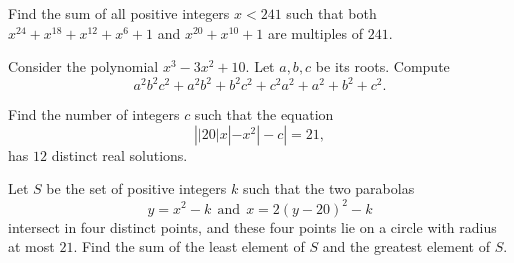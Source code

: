 \documentclass[11pt]{article}
\theoremstyle{definition}
\begin{document}
%	



\begin{question}[name={2020-21 CHMMC Winter, Tiebreaker Round, \href{https://artofproblemsolving.com/community/c126h2426280p20002356}{Problem 2}}]
	Find the sum of all positive integers $x < 241$ such that both $x^{24} + x^{18} + x^{12} + x^6 + 1$ and $x^{20} + x^{10} + 1$ are multiples of $241$.	
\end{question}




%	


\begin{question}[name={2020-21 CHMMC Winter, Tiebreaker Round, \href{https://artofproblemsolving.com/community/c126h2426287p20002417}{Problem 7}}]
	Consider the polynomial $x^3-3x^2+10$. Let $a, b, c$ be its roots. Compute $$a^2b^2c^2 + a^2b^2 + b^2c^2 + c^2a^2 + a^2 + b^2 + c^2.$$
\end{question}




%	



\begin{question}[name={2021 AIME I, \href{https://artofproblemsolving.com/community/c4p20872589}{Problem 8}}]
	Find the number of integers $c$ such that the equation$$\left||20|x|-x^2|-c\right|=21,$$
	has $12$ distinct real solutions.
\end{question}


%	












\begin{question}[name={2021 AIME I, \href{https://artofproblemsolving.com/community/c4p20872801}{Problem 15}}]
	Let $S$ be the set of positive integers $k$ such that the two parabolas$$y=x^2-k~~\text{and}~~x=2(y-20)^2-k$$intersect in four distinct points, and these four points lie on a circle with radius at most $21$. Find the sum of the least element of $S$ and the greatest element of $S$.
\end{question}
\end{document}
